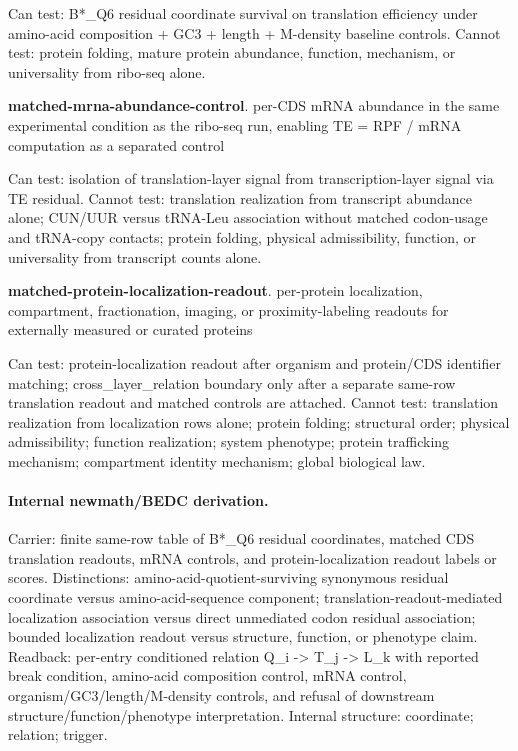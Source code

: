 Can test: B*\_Q6 residual coordinate survival on translation efficiency under amino-acid composition + GC3 + length + M-density baseline controls. Cannot test: protein folding, mature protein abundance, function, mechanism, or universality from ribo-seq alone.

\textbf{matched-mrna-abundance-control}. per-CDS mRNA abundance in the same experimental condition as the ribo-seq run, enabling TE = RPF / mRNA computation as a separated control

Can test: isolation of translation-layer signal from transcription-layer signal via TE residual. Cannot test: translation realization from transcript abundance alone; CUN/UUR versus tRNA-Leu association without matched codon-usage and tRNA-copy contacts; protein folding, physical admissibility, function, or universality from transcript counts alone.

\textbf{matched-protein-localization-readout}. per-protein localization, compartment, fractionation, imaging, or proximity-labeling readouts for externally measured or curated proteins

Can test: protein-localization readout after organism and protein/CDS identifier matching; cross\_layer\_relation boundary only after a separate same-row translation readout and matched controls are attached. Cannot test: translation realization from localization rows alone; protein folding; structural order; physical admissibility; function realization; system phenotype; protein trafficking mechanism; compartment identity mechanism; global biological law.

\paragraph{Internal newmath/BEDC derivation.} Carrier: finite same-row table of B*\_Q6 residual coordinates, matched CDS translation readouts, mRNA controls, and protein-localization readout labels or scores. Distinctions: amino-acid-quotient-surviving synonymous residual coordinate versus amino-acid-sequence component; translation-readout-mediated localization association versus direct unmediated codon residual association; bounded localization readout versus structure, function, or phenotype claim. Readback: per-entry conditioned relation Q\_i -> T\_j -> L\_k with reported break condition, amino-acid composition control, mRNA control, organism/GC3/length/M-density controls, and refusal of downstream structure/function/phenotype interpretation. Internal structure: coordinate; relation; trigger.

